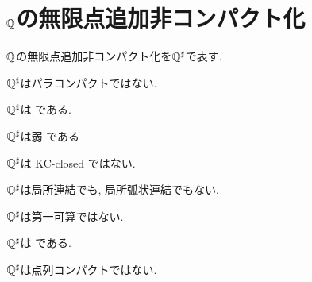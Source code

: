 \documentclass[uplatex, dvipdfmx, a4paper, 12pt, class=jsbook, crop=false]{standalone}
\begin{document}
\section{$\mathbb{Q}$の無限点追加非コンパクト化}
\label{ex:Q-star}

$ \mathbb{Q} $の無限点追加非コンパクト化を$ \mathbb{Q}^\sharp $で表す.

\begin{property}
	$ \mathbb{Q}^\sharp $はパラコンパクトではない.
\end{property}

\begin{property}
	$ \mathbb{Q}^\sharp $は \Lindelof である.
\end{property}

\begin{property}
	$ \mathbb{Q}^\sharp $は弱 \Hausdorff である
\end{property}

\begin{property}
	$ \mathbb{Q}^\sharp $は KC-closed ではない.
\end{property}

\begin{property}
	$ \mathbb{Q}^\sharp $は局所連結でも, 局所弧状連結でもない.
\end{property}

\begin{property}
	$ \mathbb{Q}^\sharp $は第一可算ではない.
\end{property}

\begin{property}
	$ \mathbb{Q}^\sharp $は \Frechet である.
\end{property}

\begin{property}
	$ \mathbb{Q}^\sharp $は点列コンパクトではない.
\end{property}
\end{document}
